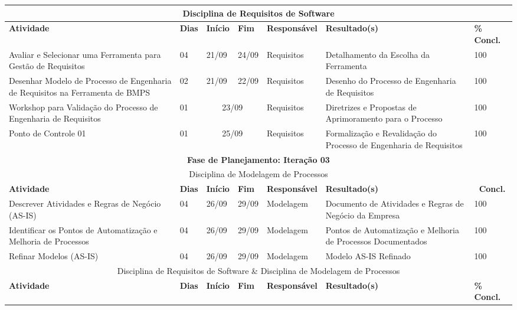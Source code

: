 \begin{center}
	\begin{tabular}{|m{6cm}|m{1cm}|m{1cm}|m{1cm}|m{4cm}|m{6cm}|m{2cm}|}
	\hline
	\multicolumn{7}{|c|}{Disciplina de Requisitos de Software} \\
	\hline
	\textbf{Atividade} & \textbf{Dias} & \textbf{Início} & \textbf{Fim} & \textbf{Responsável} & \textbf{Resultado(s)} & \textbf{\% Concl.} \\ \hline
	Avaliar e Selecionar uma Ferramenta para Gestão de Requisitos & 04 & 21/09 & 24/09 & Requisitos & Detalhamento da Escolha da Ferramenta & 100 \\ \hline
	Desenhar Modelo de Processo de Engenharia de Requisitos na Ferramenta de BMPS & 02 & 21/09 & 22/09 & Requisitos & Desenho do Processo de Engenharia de Requisitos & 100 \\ \hline
	Workshop para Validação do Processo de Engenharia de Requisitos & 01 & \multicolumn{2}{c|}{23/09} & Requisitos & Diretrizes e Propostas de Aprimoramento para o Processo & 100 \\ \hline
	Ponto de Controle 01 & 01 & \multicolumn{2}{c|}{25/09} & Requisitos & Formalização e Revalidação do Processo de Engenharia de Requisitos & 100 \\ \hline
	\multicolumn{7}{|c|}{\textbf{Fase de Planejamento: Iteração 03}} \\
	\hline
	\multicolumn{7}{|c|}{Disciplina de Modelagem de Processos} \\
	\hline
	\textbf{Atividade} & \textbf{Dias} & \textbf{Início} & \textbf{Fim} & \textbf{Responsável} & \textbf{Resultado(s)} & \textbf{\ Concl.} \\ \hline
	Descrever Atividades e Regras de Negócio (AS-IS) & 04 & 26/09 & 29/09 & Modelagem & Documento de Atividades e Regras de Negócio da Empresa & 100 \\ \hline
	Identificar os Pontos de Automatização e Melhoria de Processos & 04 & 26/09 & 29/09 & Modelagem & Pontos de Automatização e Melhoria de Processos Documentados & 100 \\ \hline
	Refinar Modelos (AS-IS) & 04 & 26/09 & 29/09 & Modelagem & Modelo AS-IS Refinado & 100 \\ \hline
	\multicolumn{7}{|c|}{Disciplina de Requisitos de Software \& Disciplina de Modelagem de Processos} \\
	\hline
	\textbf{Atividade} & \textbf{Dias} & \textbf{Início} & \textbf{Fim} & \textbf{Responsável} & \textbf{Resultado(s)} & \textbf{\% Concl.} \\ \hline
	\end{tabular}
\end{center}

